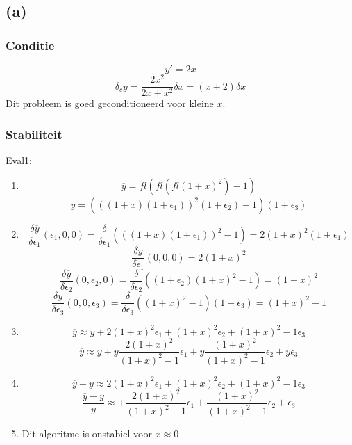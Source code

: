 \documentclass[12pt,a4paper]{article}
\begin{document}
\subsection{(a)}
\subsubsection{Conditie}
\[
y' = 2x
\]
\[
\delta_cy = \frac{2x^2}{2x+x^2}\delta x = (x + 2)\delta x
\]
Dit probleem is goed geconditioneerd voor kleine $x$.

\subsubsection{Stabiliteit}
Eval1:
\begin{enumerate}
\item
\[
\overline{y} = fl\left(fl\left(fl(1+x)^2\right)-1\right)
\]
\[
\overline{y} = (((1+x)(1+\epsilon_1))^2(1+\epsilon_2) - 1)(1+\epsilon_3)
\]

\item
\[
\frac{\delta\overline{y}}{\delta\epsilon_1}(\epsilon_1,0,0)
= \frac{\delta}{\delta\epsilon_1}(((1+x)(1+\epsilon_1))^2-1)
= 2(1+x)^2(1+\epsilon_1)
\]
\[
\frac{\delta\overline{y}}{\delta\epsilon_1}(0,0,0)
= 2(1+x)^2 
\]
\[
\frac{\delta\overline{y}}{\delta\epsilon_2}(0,\epsilon_2,0)
= \frac{\delta}{\delta\epsilon_2}((1+\epsilon_2)(1+x)^2-1)
= (1+x)^2 
\]
\[
\frac{\delta\overline{y}}{\delta\epsilon_3}(0,0,\epsilon_3)
= \frac{\delta}{\delta\epsilon_3}((1+x)^2-1)(1+\epsilon_3)
= (1+x)^2-1
\]

\item
\[
\overline{y} \approx y
+ 2(1+x)^2  \epsilon_1
+ (1+x)^2   \epsilon_2
+ (1+x)^2-1 \epsilon_3
\]
\[
\overline{y} \approx y
+ y\frac{2(1+x)^2}{(1+x)^2-1}  \epsilon_1
+ y\frac{(1+x)^2}{(1+x)^2-1}   \epsilon_2
+ y \epsilon_3
\]

\item
\[
\overline{y} - y \approx
  2(1+x)^2  \epsilon_1
+ (1+x)^2   \epsilon_2
+ (1+x)^2-1 \epsilon_3
\]
\[
\frac{\overline{y}-y}{y} \approx
+ \frac{2(1+x)^2}{(1+x)^2-1}  \epsilon_1
+ \frac{(1+x)^2}{(1+x)^2-1}   \epsilon_2
+ \epsilon_3
\]

\item
Dit algoritme is onstabiel voor $x\approx 0$

\end{enumerate}
\end{document}
